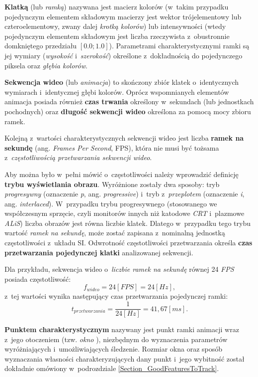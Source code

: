     \textbf{Klatką} (lub \textit{ramką}) nazywana jest macierz kolorów (w~takim przypadku pojedynczym elementem składowym macierzy jest wektor trójelementowy lub czteroelementowy, zwany dalej \textit{krotką kolorów}) lub intensywności (wtedy pojedynczym elementem składowym jest liczba rzeczywista z~obustronnie domkniętego przedziału $[0.0; 1.0]$). Parametrami charakterystycznymi ramki są jej wymiary (\textit{wysokość} i~\textit{szerokość}) określone z~dokładnością do pojedynczego piksela oraz \textit{głębia kolorów}.

    \textbf{Sekwencja wideo} (lub \textit{animacja}) to skończony zbiór klatek o~identycznych wymiarach i~identycznej głębi kolorów. Oprócz wspomnianych elementów animacja posiada również \textbf{czas trwania} określony w~sekundach (lub jednostkach pochodnych) oraz \textbf{długość sekwencji wideo} określona za pomocą mocy zbioru ramek.

    Kolejną z~wartości charakterystycznych sekwencji wideo jest liczba \textbf{ramek na sekundę} (ang. \textit{Frames Per Second}, FPS), która nie musi być tożsama z~\textit{częstotliwością przetwarzania sekwencji wideo}.

    Aby można było w~pełni mówić o~częstotliwości należy wprowadzić definicję \textbf{trybu wyświetlania obrazu}. Wyróżnione zostały dwa sposoby: tryb \textit{progresywny} (oznaczenie \textit{p}, ang. \textit{progressive}) i~tryb z~\textit{przeplotem} (oznaczenie \textit{i}, ang. \textit{interlaced}). W~przypadku trybu progresywnego (stosowanego we współczesnym sprzęcie, czyli monitorów innych niż katodowe \textit{CRT} i~plazmowe \textit{ALiS}) liczba obrazów jest równa liczbie klatek. Dlatego w~przypadku tego trybu wartość \textit{ramek na sekundę}, może zostać zapisana z~nominalną jednostką częstotliwości z~układu SI. Odwrotność częstotliwości przetwarzania określa \textbf{czas przetwarzania pojedynczej klatki} analizowanej sekwencji.

    Dla przykładu, sekwencja wideo o~\textit{liczbie ramek na sekundę} równej 24 \textit{FPS} posiada częstotliwość: \[ f_{wideo} = 24 [FPS] = 24 [Hz], \] z~tej wartości wynika następujący czas przetwarzania pojedynczej ramki: \[ t_{przetwarzania} = \frac{1}{24 [Hz]} = 41,67 [ms]. \]

    \textbf{Punktem charakterystycznym} nazywany jest punkt ramki animacji wraz z~jego otoczeniem (tzw. \textit{okno} \cite{SalientPointsTracking05}), niezbędnym do wyznaczenia parametrów wyróżniających i~umożliwiających śledzenie. Rozmiar okna oraz sposób wyznaczania własności charakteryzujących dany punkt i~jego wybitność został dokładnie omówiony w~podrozdziale \ref{Section_GoodFeaturesToTrack}.

